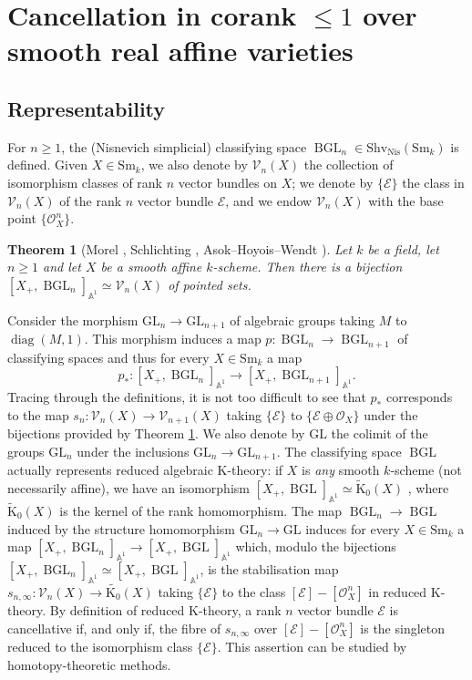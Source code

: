 \documentclass[11pt,leqno]{amsart}
\newcommand{\Osc}{{\mathscr{O}}}
\newcommand{\Esc}{{\mathscr{E}}}
\newcommand{\GL}{{\mathrm{GL}}}
\renewcommand{\1}{{\rm 1\hspace*{-0.4ex}%
\rule{0.1ex}{1.52ex}\hspace*{0.2ex}}}
\newcommand{\Nis}{{\operatorname{Nis}}}
\newcommand{\Shv}{{\mathrm{Shv}}}
\newcommand{\Sm}{\mathrm{Sm}}
\newcommand{\<}[1]{{\langle}#1 {\rangle}}
\newcommand{\Kr}{\mathrm{K}}
\newcommand{\Abb}{\mathbb{A}}
\newcommand{\Vsc}{\mathscr{V}}
\newcommand{\BGL}{\operatorname{BGL}}
\theoremstyle{plain}
\newtheorem{thm}{Theorem}[section]
\theoremstyle{definition}
\theoremstyle{remark}
\numberwithin{equation}{section}
\begin{document}
\section{Cancellation in corank $\leq 1$ over smooth real affine varieties}\label{section:cancellation}

\subsection{Representability}

For $n\geq 1$, the (Nisnevich simplicial) classifying space $\BGL_n\in\Shv_\Nis(\Sm_k)$ is defined. Given $X\in\Sm_k$, we also denote by $\Vsc_n(X)$ the collection of isomorphism classes of rank $n$ vector bundles on $X$; we denote by $\{\Esc\}$ the class in $\Vsc_n(X)$ of the rank $n$ vector bundle $\Esc$, and we endow $\Vsc_n(X)$ with the base point $\{\Osc_X^{n}\}$.

\begin{thm}[Morel , Schlichting , Asok--Hoyois--Wendt ]\label{theo:representability}
Let $k$ be a field, let $n\geq 1$ and let $X$ be a smooth affine $k$-scheme. Then there is a bijection $[X_+,\BGL_n]_{\Abb^1}\simeq\mathscr{V}_n(X)$ of pointed sets.
\end{thm}

Consider the morphism $\GL_n\rightarrow\GL_{n+1}$ of algebraic groups taking $M$ to $\operatorname{diag}(M,1)$. This morphism induces a map $p:\BGL_n\rightarrow\BGL_{n+1}$ of classifying spaces and thus for every $X\in\Sm_k$ a map \[p_*:[X_+,\BGL_n]_{\Abb^1}\rightarrow[X_+,\BGL_{n+1}]_{\Abb^1}.\] Tracing through the definitions, it is not too difficult to see that $p_*$ corresponds to the map $s_n:\Vsc_n(X)\rightarrow\Vsc_{n+1}(X)$ taking $\{\Esc\}$ to $\{\Esc\oplus\Osc_X\}$ under the bijections provided by Theorem \ref{theo:representability}. We also denote by $\GL$ the colimit of the groups $\GL_n$ under the inclusions $\GL_n\rightarrow\GL_{n+1}$. The classifying space $\BGL$ actually represents reduced algebraic $\Kr$-theory: if $X$ is \emph{any} smooth $k$-scheme (not necessarily affine), we have an isomorphism $[X_+,\BGL]_{\Abb^1}\simeq\widetilde{\Kr}_0(X)$ \cite[§4, Theorem 3.13]{morelA1homotopyTheorySchemes1999}, where $\widetilde{\Kr}_0(X)$ is the kernel of the rank homomorphism. The map $\BGL_n\rightarrow\BGL$ induced by the structure homomorphism $\GL_n\rightarrow\GL$ induces for every $X\in\Sm_k$ a map $[X_+,\BGL_n]_{\Abb^1}\rightarrow[X_+,\BGL]_{\Abb^1}$ which, modulo the bijections $[X_+,\BGL_n]_{\Abb^1}\simeq[X_+,\BGL]_{\Abb^1}$, is the stabilisation map $s_{n,\infty}:\Vsc_n(X)\rightarrow\widetilde{\Kr_0}(X)$ taking $\{\Esc\}$ to the class $[\Esc]-[\Osc_X^n]$ in reduced $\Kr$-theory. By definition of reduced $\Kr$-theory, a rank $n$ vector bundle $\Esc$ is cancellative if, and only if, the fibre of $s_{n,\infty}$ over $[\Esc]-[\Osc_X^n]$ is the singleton reduced to the isomorphism class $\{\Esc\}$. This assertion can be studied by homotopy-theoretic methods.%
\end{document}
